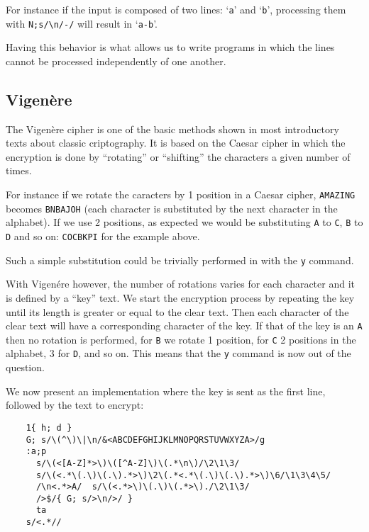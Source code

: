 For instance if the input is composed of two lines: `{\tt a}' and `{\tt b}',
processing them with \verb|N;s/\n/-/| will result in `{\tt a-b}'.

Having this behavior is what allows us to write programs in which the lines
cannot be processed independently of one another.

\subsection{Vigen\`ere}

The Vigen\`ere cipher is one of the basic methods shown in most introductory
texts about classic criptography.  It is based on the Caesar cipher in which the
encryption is done by ``rotating'' or ``shifting'' the characters a given
number of times.

For instance if we rotate the caracters by 1 position in a Caesar cipher,
{\tt AMAZING} becomes {\tt BNBAJOH} (each character is substituted by the
next character in the alphabet).  If we use 2 positions, as expected we would
be substituting {\tt A} to {\tt C}, {\tt B} to {\tt D} and so on:
{\tt COCBKPI} for the example above.

Such a simple substitution could be trivially performed in \sed with the
{\tt y} command.

With Vigen\'ere however, the number of rotations varies for each character and
it is defined by a ``key'' text.  We start the encryption process by repeating
the key until its length is greater or equal to the clear text.  Then each
character of the clear text will have a corresponding character of the key.
If that of the key is an {\tt A} then no rotation is performed,
for {\tt B} we rotate 1 position, for {\tt C} 2 positions in the alphabet,
3 for {\tt D}, and so on.  This means that the {\tt y} command is now out of
the question.

We now present an implementation where the key is sent as the first line,
followed by the text to encrypt:

\begin{Verbatim}
	1{ h; d }
	G; s/\(^\)\|\n/&<ABCDEFGHIJKLMNOPQRSTUVWXYZA>/g
	:a;p
	  s/\(<[A-Z]*>\)\([^A-Z]\)\(.*\n\)/\2\1\3/
	  s/\(<.*\(.\)\(.\).*>\)\2\(.*<.*\(.\)\(.\).*>\)\6/\1\3\4\5/
	  /\n<.*>A/  s/\(<.*>\)\(.\)\(.*>\)./\2\1\3/
	  />$/{ G; s/>\n/>/ }
	  ta
	s/<.*//
\end{Verbatim}

